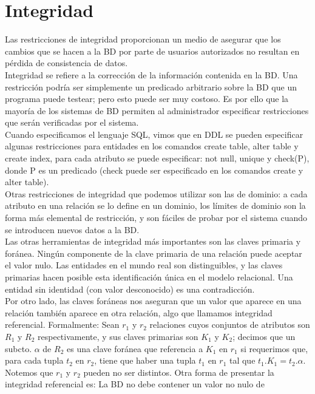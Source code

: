 \documentclass[a4paper]{article}
\begin{document}
\section{Integridad}
Las restricciones de integridad proporcionan un medio de asegurar que los cambios que se hacen
a la BD por parte de usuarios autorizados no resultan en pérdida de consistencia de datos. \\
Integridad se refiere a la corrección de la información contenida en la BD. Una restricción
podría ser simplemente un predicado arbitrario sobre la BD que un programa puede testear; pero
esto puede ser muy costoso. Es por ello que la mayoría de los sistemas de BD permiten al
administrador especificar restricciones que serán verificadas por el sistema. \\
Cuando especificamos el lenguaje SQL, vimos que en DDL se pueden especificar algunas restricciones
para entidades en los comandos create table, alter table y create index, para cada atributo se
puede especificar: not null, unique y check(P), donde P es un predicado (check puede ser
especificado en los comandos create y alter table). \\
Otras restricciones de integridad que podemos utilizar son las de dominio: a cada atributo en una
relación se lo define en un dominio, los límites de dominio son la forma más elemental de
restricción, y son fáciles de probar por el sistema cuando se introducen nuevos datos a la BD. \\
Las otras herramientas de integridad m\'as importantes son las claves primaria y for\'anea.
Ning\'un componente de la clave primaria de una relaci\'on puede aceptar el valor nulo. Las
entidades en el mundo real son distinguibles, y las claves primarias hacen posible esta
identificaci\'on \'unica en el modelo relacional. Una entidad sin identidad (con valor
desconocido) es una contradicci\'on. \\
Por otro lado, las claves for\'aneas nos aseguran que un valor que aparece en una relaci\'on
tambi\'en aparece en otra relaci\'on, algo que llamamos integridad referencial. Formalmente:
Sean $r_{1}$ y $r_{2}$ relaciones cuyos conjuntos de atributos son $R_{1}$ y $R_{2}$
respectivamente, y sus claves primarias son $K_{1}$ y $K_{2}$; decimos que un subcto. $\alpha$
de $R_{2}$ es una clave for\'anea que referencia a $K_{1}$ en $r_{1}$ si requerimos que,
para cada tupla $t_{2}$ en $r_{2}$, tiene que haber una tupla $t_{1}$ en $r_{1}$ tal que
$t_{1}.K_{1} = t_{2}.\alpha$. Notemos que $r_{1}$ y $r_{2}$ pueden no ser distintos. Otra
forma de presentar la integridad referencial es: La BD no debe contener un valor no nulo de
\end{document}

